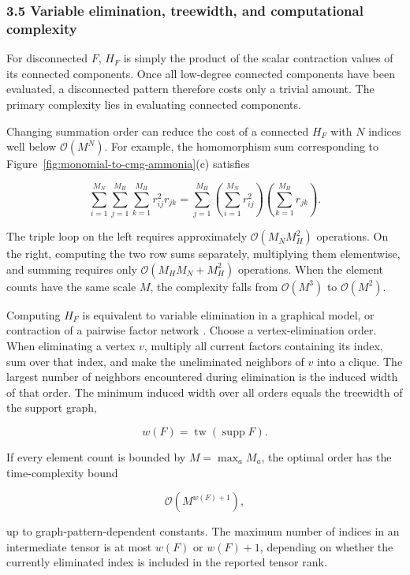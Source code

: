 \subsubsection{3.5 Variable elimination, treewidth, and computational complexity}\label{sec:treewidth-complexity}

For disconnected \(F\), \(H_F\) is simply the product of the scalar contraction values of its connected components. Once all low-degree connected components have been evaluated, a disconnected pattern therefore costs only a trivial amount. The primary complexity lies in evaluating connected components.

Changing summation order can reduce the cost of a connected \(H_F\) with \(N\) indices well below \(\mathcal O(M^N)\). For example, the homomorphism sum corresponding to Figure~\ref{fig:monomial-to-cmg-ammonia}(c) satisfies

\[
\sum_{i=1}^{M_N}\sum_{j=1}^{M_H}\sum_{k=1}^{M_H}
r_{ij}^{2}r_{jk}
=
\sum_{j=1}^{M_H}
\left(\sum_{i=1}^{M_N}r_{ij}^{2}\right)
\left(\sum_{k=1}^{M_H}r_{jk}\right).
\]

The triple loop on the left requires approximately \(\mathcal O(M_NM_H^2)\) operations. On the right, computing the two row sums separately, multiplying them elementwise, and summing requires only \(\mathcal O(M_HM_N+M_H^2)\) operations. When the element counts have the same scale \(M\), the complexity falls from \(\mathcal O(M^3)\) to \(\mathcal O(M^2)\).

Computing \(H_F\) is equivalent to variable elimination in a graphical model, or contraction of a pairwise factor network \cite{Dechter1999BucketElimination,MarkovShi2008TensorNetworks}. Choose a vertex-elimination order. When eliminating a vertex \(v\), multiply all current factors containing its index, sum over that index, and make the uneliminated neighbors of \(v\) into a clique. The largest number of neighbors encountered during elimination is the induced width of that order. The minimum induced width over all orders equals the treewidth of the support graph,

\[
w(F)=\operatorname{tw}(\operatorname{supp}F).
\]

If every element count is bounded by \(M=\max_a M_a\), the optimal order has the time-complexity bound

\[
\mathcal O\!\left(M^{w(F)+1}\right),
\]

up to graph-pattern-dependent constants. The maximum number of indices in an intermediate tensor is at most \(w(F)\) or \(w(F)+1\), depending on whether the currently eliminated index is included in the reported tensor rank.


